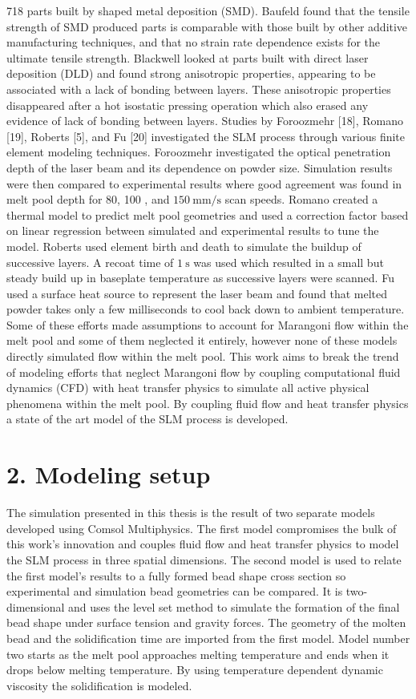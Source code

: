\documentclass[10pt]{article}
\begin{document}
718 parts built by shaped metal deposition (SMD). Baufeld found that the tensile strength of SMD produced parts is comparable with those built by other additive manufacturing techniques, and that no strain rate dependence exists for the ultimate tensile strength. Blackwell looked at parts built with direct laser deposition (DLD) and found strong anisotropic properties, appearing to be associated with a lack of bonding between layers. These anisotropic properties disappeared after a hot isostatic pressing operation which also erased any evidence of lack of bonding between layers. Studies by Foroozmehr [18], Romano [19], Roberts [5], and Fu [20] investigated the SLM process through various finite element modeling techniques. Foroozmehr investigated the optical penetration depth of the laser beam and its dependence on powder size. Simulation results were then compared to experimental results where good agreement was found in melt pool depth for 80, 100 , and $150 \mathrm{~mm} / \mathrm{s}$ scan speeds. Romano created a thermal model to predict melt pool geometries and used a correction factor based on linear regression between simulated and experimental results to tune the model. Roberts used element birth and death to simulate the buildup of successive layers. A recoat time of $1 \mathrm{~s}$ was used which resulted in a small but steady build up in baseplate temperature as successive layers were scanned. Fu used a surface heat source to represent the laser beam and found that melted powder takes only a few milliseconds to cool back down to ambient temperature. Some of these efforts made assumptions to account for Marangoni flow within the melt pool and some of them neglected it entirely, however none of these models directly simulated flow within the melt pool. This work aims to break the trend of modeling efforts that neglect Marangoni flow by coupling computational fluid dynamics (CFD) with heat transfer physics to simulate all active physical phenomena within the melt pool. By coupling fluid flow and heat transfer physics a state of the art model of the SLM process is developed.

\section*{2. Modeling setup}
The simulation presented in this thesis is the result of two separate models developed using Comsol Multiphysics. The first model compromises the bulk of this work's innovation and couples fluid flow and heat transfer physics to model the SLM process in three spatial dimensions. The second model is used to relate the first model's results to a fully formed bead shape cross section so experimental and simulation bead geometries can be compared. It is two-dimensional and uses the level set method to simulate the formation of the final bead shape under surface tension and gravity forces. The geometry of the molten bead and the solidification time are imported from the first model. Model number two starts as the melt pool approaches melting temperature and ends when it drops below melting temperature. By using temperature dependent dynamic viscosity the solidification is modeled.
\end{document}
